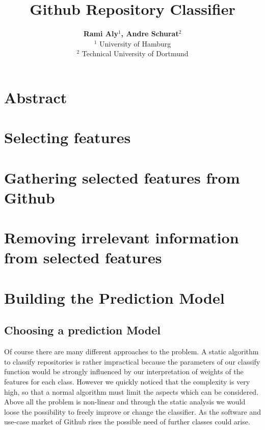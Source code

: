 \documentclass[paper=A4,pagesize=auto,13pt,headinclude=true,footinclude=true,BCOR=0mm,DIV=calc]{scrartcl}
\begin{document}
	
	\title{Github Repository Classifier}
	\author{\textbf{Rami Aly$^{1}$, Andre Schurat}$^{2}$\\
		$^{1}$ University of Hamburg\\
		$^{2}$ Technical University of Dortmund}
	\maketitle
	
	\newpage
	
	\section{Abstract}
	
	
	\newpage
	
	\tableofcontents 
	
	\newpage
	\section{Selecting features} 
	
	
	\section{Gathering selected features from Github}
	
	
	
	\section{Removing irrelevant information from selected features}

	
	
	\section{Building the Prediction Model}
	\subsection{Choosing a prediction Model}
	Of course there are many different approaches to the problem. A static algorithm to classify repositories is rather impractical because the parameters of our classify function would be strongly influenced by our interpretation of weights of the features for each class. However we quickly noticed that the complexity is very high, so that a normal algorithm must limit the aspects which can be considered. Above all the problem is non-linear and through the static analysis we would loose the possibility to freely improve or change the classifier. As the software and use-case market of Github rises the possible need of further classes could arise.
	
\end{document}
